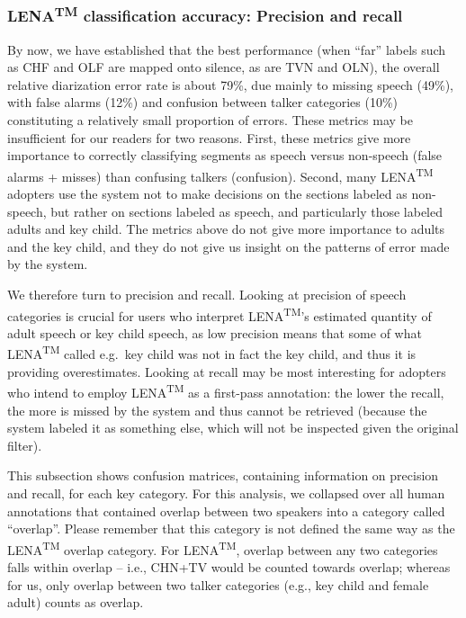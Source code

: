 \documentclass[english,floatsintext,man]{apa6}
\begin{document}
\subsubsection{\texorpdfstring{LENA\textsuperscript{TM} classification
accuracy: Precision and
recall}{LENATM classification accuracy: Precision and recall}}\label{lenatm-classification-accuracy-precision-and-recall}

By now, we have established that the best performance (when
\enquote{far} labels such as CHF and OLF are mapped onto silence, as are
TVN and OLN), the overall relative diarization error rate is about 79\%,
due mainly to missing speech (49\%), with false alarms (12\%) and
confusion between talker categories (10\%) constituting a relatively
small proportion of errors. These metrics may be insufficient for our
readers for two reasons. First, these metrics give more importance to
correctly classifying segments as speech versus non-speech (false alarms
+ misses) than confusing talkers (confusion). Second, many
LENA\textsuperscript{TM} adopters use the system not to make decisions
on the sections labeled as non-speech, but rather on sections labeled as
speech, and particularly those labeled adults and key child. The metrics
above do not give more importance to adults and the key child, and they
do not give us insight on the patterns of error made by the system.

We therefore turn to precision and recall. Looking at precision of
speech categories is crucial for users who interpret
LENA\textsuperscript{TM}'s estimated quantity of adult speech or key
child speech, as low precision means that some of what
LENA\textsuperscript{TM} called e.g.~key child was not in fact the key
child, and thus it is providing overestimates. Looking at recall may be
most interesting for adopters who intend to employ
LENA\textsuperscript{TM} as a first-pass annotation: the lower the
recall, the more is missed by the system and thus cannot be retrieved
(because the system labeled it as something else, which will not be
inspected given the original filter).

This subsection shows confusion matrices, containing information on
precision and recall, for each key category. For this analysis, we
collapsed over all human annotations that contained overlap between two
speakers into a category called \enquote{overlap}. Please remember that
this category is not defined the same way as the
LENA\textsuperscript{TM} overlap category. For LENA\textsuperscript{TM},
overlap between any two categories falls within overlap -- i.e., CHN+TV
would be counted towards overlap; whereas for us, only overlap between
two talker categories (e.g., key child and female adult) counts as
overlap.
\end{document}
